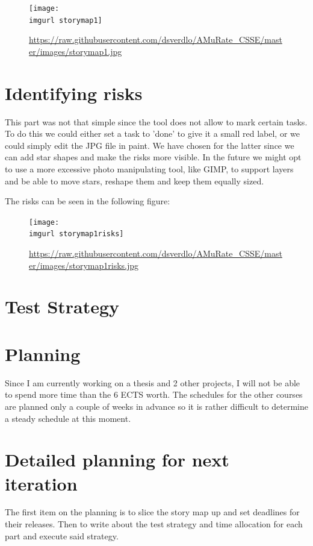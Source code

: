 \documentclass[12pt,portrait]{article}
\newcommand{\imgurl}{../images/} %
\newcommand{\weburl}[1]{\url{https://raw.githubusercontent.com/dsverdlo/AMuRate_CSSE/master/images/#1}}
\begin{document}
\begin{figure}[h]
\texttt{[image: \\imgurl storymap1]}
\caption{\weburl{storymap1.jpg} }
\end{figure}
 
 
\section{Identifying risks}

This part was not that simple since the tool does not allow to mark certain tasks. To do this we could either set a task to 'done' to give it a small red label, or we could simply edit the JPG file in paint. We have chosen for the latter since we can add star shapes and make the risks more visible. In the future we might opt to use a more excessive photo manipulating tool, like GIMP, to support layers and be able to move stars, reshape them and keep them equally sized.

The risks can be seen in the following figure:
\begin{figure}[h]
	\texttt{[image: \\imgurl storymap1risks]}
	\caption{\weburl{storymap1risks.jpg}}
\end{figure}

\section{Test Strategy}


\section{Planning}

Since I am currently working on a thesis and 2 other projects, I will not be able to spend more time than the 6 ECTS worth. The schedules for the other courses are planned only a couple of weeks in  advance so it is rather difficult to determine a steady schedule at this moment.


\section{Detailed planning for next iteration}

The first item on the planning is to slice the story map up and set deadlines for their releases. Then to write about the test strategy and time allocation for each part and execute said strategy.









\end{document}
